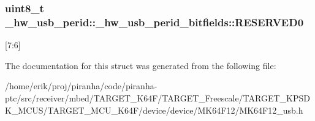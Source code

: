 \subsubsection[{\texorpdfstring{R\+E\+S\+E\+R\+V\+E\+D0}{RESERVED0}}]{\setlength{\rightskip}{0pt plus 5cm}uint8\+\_\+t \+\_\+hw\+\_\+usb\+\_\+perid\+::\+\_\+hw\+\_\+usb\+\_\+perid\+\_\+bitfields\+::\+R\+E\+S\+E\+R\+V\+E\+D0}\hypertarget{struct__hw__usb__perid_1_1__hw__usb__perid__bitfields_a9ab86e31e9bd63ad669b02cf039fc292}{}\label{struct__hw__usb__perid_1_1__hw__usb__perid__bitfields_a9ab86e31e9bd63ad669b02cf039fc292}
\mbox{[}7\+:6\mbox{]} 

The documentation for this struct was generated from the following file\+:\begin{DoxyCompactItemize}
\item 
/home/erik/proj/piranha/code/piranha-\/ptc/src/receiver/mbed/\+T\+A\+R\+G\+E\+T\+\_\+\+K64\+F/\+T\+A\+R\+G\+E\+T\+\_\+\+Freescale/\+T\+A\+R\+G\+E\+T\+\_\+\+K\+P\+S\+D\+K\+\_\+\+M\+C\+U\+S/\+T\+A\+R\+G\+E\+T\+\_\+\+M\+C\+U\+\_\+\+K64\+F/device/device/\+M\+K64\+F12/M\+K64\+F12\+\_\+usb.\+h\end{DoxyCompactItemize}

